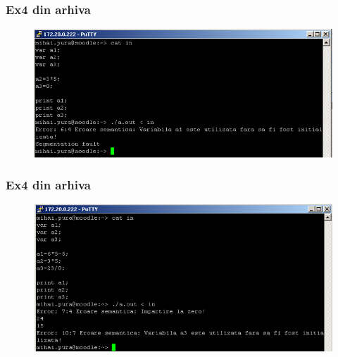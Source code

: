 \documentclass[pdf]{beamer}
\begin{document}
\begin{frame}
\frametitle{Ex4 din arhiva}
\begin{figure}
\includegraphics[width=\linewidth]{poza3.png} 
\end{figure}
\end{frame}



\begin{frame}
\frametitle{Ex4 din arhiva}
\begin{figure}
\includegraphics[width=\linewidth]{poza4.png} 
\end{figure}
\end{frame}
\end{document}
